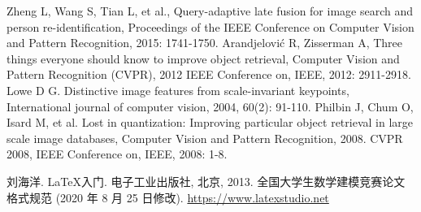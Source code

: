 \documentclass[bwprint]{gmcmthesis}
\begin{document}




\newpage



\begin{thebibliography}{99}  
Zheng L, Wang S, Tian L, et al., Query-adaptive late fusion for image search and person re-identification, Proceedings of the IEEE Conference on Computer Vision and Pattern Recognition, 2015: 1741-1750.  
Arandjelović R, Zisserman A, Three things everyone should know to improve object retrieval, Computer Vision and Pattern Recognition (CVPR), 2012 IEEE Conference on, IEEE, 2012: 2911-2918.  
Lowe D G. Distinctive image features from scale-invariant keypoints, International journal of computer vision, 2004, 60(2): 91-110.  
Philbin J, Chum O, Isard M, et al. Lost in quantization: Improving particular object retrieval in large scale image databases, Computer Vision and Pattern Recognition, 2008. CVPR 2008, IEEE Conference on, IEEE, 2008: 1-8.  
\end{thebibliography}



% 
% 


\begin{thebibliography}{9}%
    刘海洋.
    \newblock \LaTeX {}入门\allowbreak[J].
    \newblock 电子工业出版社, 北京, 2013.
    全国大学生数学建模竞赛论文格式规范 (2020 年 8 月 25 日修改).
     \url{https://www.latexstudio.net}
\end{thebibliography}
\end{document}
